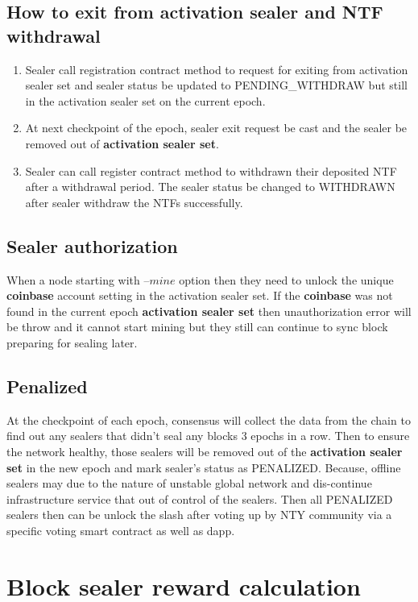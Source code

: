 \documentclass[12pt,oneside]{amsart}
\begin{document}
\begin{multicols}{2}
\subsection{How to exit from activation sealer and NTF withdrawal}
\begin{enumerate}
\item Sealer call registration contract method to request for exiting from activation sealer set and sealer status be updated to {\small PENDING\_WITHDRAW} but still in the activation sealer set on the current epoch.
\item At next checkpoint of the epoch, sealer exit request be cast and the sealer be removed out of \textbf{activation sealer set}. 
\item Sealer can call register contract method to withdrawn their deposited {\small NTF} after a withdrawal period. The sealer status be changed to {\small WITHDRAWN} after sealer withdraw the {\small NTFs} successfully.
\end{enumerate}

\subsection{Sealer authorization}
When a node starting with --${mine}$ option then they need to unlock the unique \textbf{coinbase} account setting in the activation sealer set. If the \textbf{coinbase} was not found in the current epoch \textbf{activation sealer set} then unauthorization error will be throw and it cannot start mining but they still can continue to sync block preparing for sealing later.

\subsection{Penalized}

At the checkpoint of each epoch, consensus will collect the data from the chain to find out any sealers that didn't seal any blocks 3 epochs in a row. Then to ensure the network healthy, those sealers will be removed out of the \textbf{activation sealer set} in the new epoch and mark sealer's status as {\small PENALIZED}. Because, offline sealers may due to the nature of unstable global network and dis-continue infrastructure service that out of control of the sealers. Then all {\small PENALIZED} sealers then can be unlock the slash after voting up by {\small NTY} community via a specific voting smart contract as well as dapp. 

\section{Block sealer reward calculation}


\end{multicols}
\end{document}
